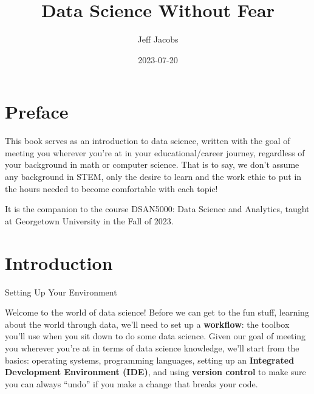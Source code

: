 \documentclass[
  letterpaper,
  DIV=11,
  numbers=noendperiod,
  oneside]{scrreprt}
\title{Data Science Without Fear}
\author{Jeff Jacobs}
\date{2023-07-20}
\renewcommand*\contentsname{Table of contents}
\newcommand\contentsname{Table of contents}
\begin{document}
\maketitle
\ifdefined\Shaded\renewenvironment{Shaded}{\begin{tcolorbox}[interior hidden, sharp corners, boxrule=0pt, frame hidden, borderline west={3pt}{0pt}{shadecolor}, enhanced, breakable]}{\end{tcolorbox}}\fi

\renewcommand*\contentsname{Table of contents}
{
\hypersetup{linkcolor=}
\setcounter{tocdepth}{2}
\tableofcontents
}

\hypertarget{preface}{%
\chapter*{Preface}\label{preface}}


This book serves as an introduction to data science, written with the
goal of meeting you wherever you're at in your educational/career
journey, regardless of your background in math or computer science. That
is to say, we don't assume any background in STEM, only the desire to
learn and the work ethic to put in the hours needed to become
comfortable with each topic!

It is the companion to the course DSAN5000: Data Science and Analytics,
taught at Georgetown University in the Fall of 2023.


\hypertarget{introduction}{%
\chapter{Introduction}\label{introduction}}

Setting Up Your Environment

\hfill\break

Welcome to the world of data science! Before we can get to the fun
stuff, learning about the world through data, we'll need to set up a
\textbf{workflow}: the toolbox you'll use when you sit down to do some
data science. Given our goal of meeting you wherever you're at in terms
of data science knowledge, we'll start from the basics: operating
systems, programming languages, setting up an \textbf{Integrated
Development Environment (IDE)}, and using \textbf{version control} to
make sure you can always ``undo'' if you make a change that breaks your
code.
\end{document}
